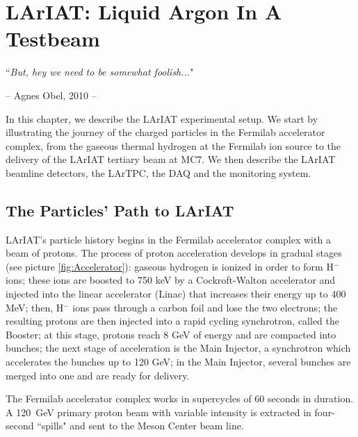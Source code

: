 
\chapter{LArIAT: Liquid Argon In A Testbeam}\label{sec:experimentDescription}
{\raggedleft ``\emph{But, hey we need to be somewhat foolish...}" \par}
{\raggedleft -- Agnes Obel, 2010 -- \par} %
\vspace{0.5cm}


In this chapter, we describe the LArIAT experimental setup. We start by illustrating the journey of the charged particles in the Fermilab accelerator complex, from the gaseous thermal hydrogen at the Fermilab ion source to the delivery of the LArIAT tertiary beam at MC7. We  then describe the LArIAT beamline detectors, the LArTPC, the DAQ and the monitoring system.

\section{The Particles' Path to LArIAT}

LArIAT's particle history begins in the Fermilab accelerator complex with a beam of protons. The process of proton acceleration develops in gradual stages (see picture \ref{fig:Accelerator}): gaseous hydrogen is ionized in order to form H$^{-}$ ions; these ions are boosted to 750 keV by a Cockroft-Walton accelerator and injected into the linear accelerator (Linac) that increases their energy up to 400 MeV; then, H$^{-}$ ions pass through a carbon foil and lose the two electrons; the resulting protons are then injected into a rapid cycling synchrotron, called the Booster; at this stage, protons reach 8 GeV of energy and are compacted into bunches; the next stage of acceleration is the Main Injector, a synchrotron which accelerates the bunches up to 120 GeV; in the Main Injector, several bunches are merged into one and are ready for delivery.


The Fermilab accelerator complex works in supercycles of  60 seconds in duration. A 120~GeV primary proton beam with variable intensity is extracted in four-second ``spills" and sent to the Meson Center beam line.  %

